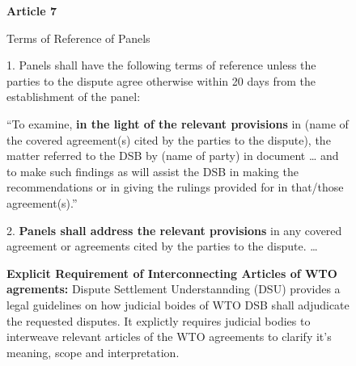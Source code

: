 \begin{figure}
  \begin{displayquote}[][]
    \begin{center}
      \textbf{Article 7}
    \end{center}
    \begin{center}
      Terms of Reference of Panels
    \end{center}
  
    1. Panels shall have the following terms of reference unless the parties to the dispute
    agree otherwise within 20 days from the establishment of the panel:
  
    \begin{displayquote}[][]
  
      ``To examine, \textbf{in the light of the relevant provisions} in (name of the covered
      agreement(s) cited by the parties to the dispute), the matter referred to the DSB by
      (name of party) in document … and to make such findings as will assist the DSB in
      making the recommendations or in giving the rulings provided for in that/those
      agreement(s).''
        
    \end{displayquote}
  
    2. \textbf{Panels shall address the relevant provisions} in any covered agreement or agreements
    cited by the parties to the dispute. \ldots
  \end{displayquote}
  \caption{\textbf{Explicit Requirement of Interconnecting Articles of WTO agrements:} Dispute Settlement Understannding (DSU) provides a legal guidelines on how judicial boides of WTO DSB shall adjudicate the requested disputes.
  It explictly requires judicial bodies to interweave relevant articles of the WTO agreements to clarify
  it's meaning, scope and interpretation.
  } 
  \label{fig:art7dsu}
\end{figure}

